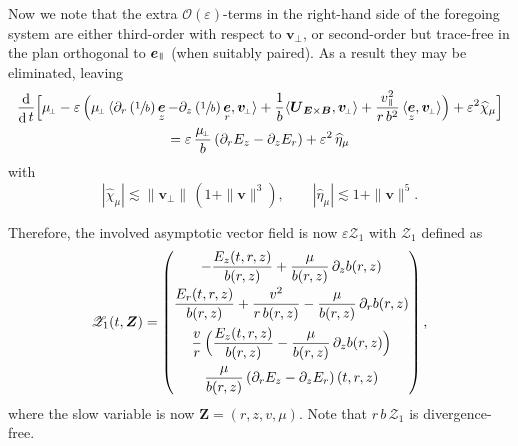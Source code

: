 \documentclass[10pt]{amsart}
\let\mathcal\mathscr
\newcommand{\sperp}{{\scriptscriptstyle\perp}}
\let\eps\varepsilon
\let\d\partial
\DeclareMathOperator\dD{d}\let\dd\dD
\theoremstyle{plain}
\theoremstyle{definition}
\newcommand\bp{\begin{pmatrix}}
\newcommand\ep{\end{pmatrix}}
\newcommand{\be}{\begin{equation}}
\newcommand{\ee}{\end{equation}}
\newcommand\bB{{\boldsymbol B}}
\newcommand\bE{{\boldsymbol E}}
\newcommand\bU{{\boldsymbol U}}
\newcommand\bfv{{\boldsymbol v}}
\newcommand\bfZ{{\boldsymbol Z}}
\newcommand\cO{{\mathcal O}}
\newcommand\cZ{{\mathcal Z}}
\DeclareMathOperator{\beD}{\boldsymbol{e}}
\newcommand\eDr{\beD_r}
\newcommand\eDz{\beD_z}
\newcommand\eDpar{\beD_\mypar}
\newcommand\vpar{v_\mypar}
\newcommand\bvperp{\bfv_{\!\sperp}}
\newcommand\muperp{\mu_{\!\sperp}}
\newcommand\Er{E_r}
\newcommand\Ez{E_z}
\newcommand{\EcB}{\bU_{\bE\times\bB}}
\newcommand{\mypar}{{\mkern3mu\vphantom{\perp}\vrule depth 0pt\mkern2mu\vrule depth 0pt\mkern3mu}}
\begin{document}
Now we note that the extra $\cO(\eps)$-terms in the right-hand side of the foregoing system are either third-order with respect to $\bvperp$, or second-order but trace-free in the plan orthogonal to $\eDpar$ (when suitably paired). As a result they may be eliminated, leaving
\begin{multline*}
\frac{\dD}{\dD t}\Bigl[\muperp
-\eps\,\Bigl(
\muperp\,\langle \d_r\left(\sfrac1b\right)\eDz-\d_z\left(\sfrac1b\right)\eDr,\bvperp\rangle
+\frac1b\langle\EcB,\bvperp\rangle
+\frac{\vpar^2}{r\,b^2}
\,\langle\eDz,\bvperp\rangle
\Bigr)+\eps^2\widehat\chi_\mu\Bigr]\\
=
\eps\,\frac{\muperp}{b}\left(\d_r\Ez-\d_z\Er\right) +\eps^2\,\widehat\eta_\mu
\end{multline*}
with
\be\label{mu-axi-remainders}
|\widehat\chi_\mu|\lesssim \|\bvperp\|\,(1+\|\bfv\|^3),\qquad
|\widehat\eta_\mu|\lesssim 1+\|\bfv\|^5.
\ee

Therefore, the involved asymptotic vector field is now $\eps\cZ_1$ with $\cZ_1$ defined as
\[
\cZ_1(t,\bfZ)
=\bp
-\dfrac{\Ez(t,r,z)}{b(r,z)}+\dfrac{\mu}{b(r,z)}\,\d_zb(r,z)\\[8pt]
\dfrac{\Er(t,r,z)}{b(r,z)}+\dfrac{v^2}{r\,b(r,z)}
-\dfrac{\mu}{b(r,z)}\,\d_rb(r,z)
\\[10pt]
\dfrac{v}{r}\,\Bigl(\dfrac{\Ez(t,r,z)}{b(r,z)}
-\dfrac{\mu}{b(r,z)}\,\d_zb(r,z)\Bigr)\\[10pt]
\dfrac{\mu}{b(r,z)}\left(\d_r\Ez-\d_z\Er\right)(t,r,z)
\ep,
\]
where the slow variable is now $\bfZ=(r,z,v,\mu)$. Note that $r\,b\,\cZ_1$ is divergence-free.
\end{document}
